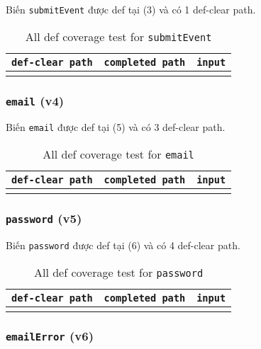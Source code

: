 \documentclass{article}
\begin{document}
\par Biến \texttt{submitEvent} được def tại (3) và có 1 def-clear path.

\FloatBarrier
\begin{table}[htp]
    \centering
    \begin{tabular}{c|c|c}
        \texttt{def-clear path} & \texttt{completed path} & \texttt{input} \\
        \toprule
        \bottomrule
         &  &
    \end{tabular}
    \caption{All def coverage test for \texttt{submitEvent}}
\end{table}
\FloatBarrier

\subsubsection*{\texttt{email} (v4)}

\par Biến \texttt{email} được def tại (5) và có 3 def-clear path.

\FloatBarrier
\begin{table}[htp]
    \centering
    \begin{tabular}{c|c|c}
        \texttt{def-clear path} & \texttt{completed path} & \texttt{input} \\
        \toprule
        \bottomrule
         &  &
    \end{tabular}
    \caption{All def coverage test for \texttt{email}}
\end{table}
\FloatBarrier

\subsubsection*{\texttt{password} (v5)}

\par Biến \texttt{password} được def tại (6) và có 4 def-clear path.

\FloatBarrier
\begin{table}[htp]
    \centering
    \begin{tabular}{c|c|c}
        \texttt{def-clear path} & \texttt{completed path} & \texttt{input} \\
        \toprule
        \bottomrule
         &  &
    \end{tabular}
    \caption{All def coverage test for \texttt{password}}
\end{table}
\FloatBarrier

\subsubsection*{\texttt{emailError} (v6)}
\end{document}

